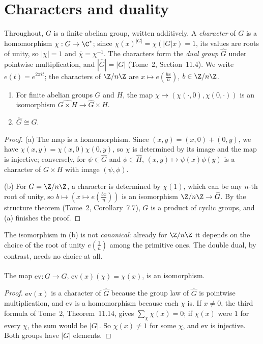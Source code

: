 \section{Characters and duality}

Throughout, $G$ is a finite abelian group, written additively. A \emph{character} of $G$ is a homomorphism $\chi:G\to\C^*$; since
$\chi(x)^{|G|}=\chi(|G|x)=1$, its values are roots of unity, so $|\chi|=1$ and $\overline{\chi}=\chi^{-1}$. The characters form the
\emph{dual group} $\widehat G$ under pointwise multiplication, and $|\widehat G|=|G|$ (Tome~2, Section~11.4). We write $e(t)=e^{2\pi it}$; the
characters of $\Z/n\Z$ are $x\mapsto e(\frac{bx}n)$, $b\in\Z/n\Z$.

\begin{proposition}\label{prop:dualprod}
\begin{enumerate}
\item[(a)] For finite abelian groups $G$ and $H$, the map $\chi\mapsto(\chi(\cdot,0),\chi(0,\cdot))$ is an isomorphism $\widehat{G\times H}\to\widehat G\times\widehat H$.
\item[(b)] $\widehat G\cong G$.
\end{enumerate}
\end{proposition}
\begin{proof}
(a) The map is a homomorphism. Since $(x,y)=(x,0)+(0,y)$, we have $\chi(x,y)=\chi(x,0)\chi(0,y)$, so $\chi$ is determined by its image
and the map is injective; conversely, for $\psi\in\widehat G$ and $\phi\in\widehat H$, $(x,y)\mapsto\psi(x)\phi(y)$ is a character of
$G\times H$ with image $(\psi,\phi)$.

(b) For $G=\Z/n\Z$, a character is determined by $\chi(1)$, which can be any $n$-th root of unity, so $b\mapsto(x\mapsto e(\frac{bx}n))$
is an isomorphism $\Z/n\Z\to\widehat G$. By the structure theorem (Tome~2, Corollary~7.7), $G$ is a product of cyclic groups, and (a)
finishes the proof.
\end{proof}

The isomorphism in (b) is not \emph{canonical}: already for $\Z/n\Z$ it depends on the choice of the root of unity $e(\frac1n)$ among the
primitive ones. The double dual, by contrast, needs no choice at all.

\begin{theorem}[duality]\label{thm:finiteduality}
The map $\mathrm{ev}:G\to\widehat{\widehat G}$, $\mathrm{ev}(x)(\chi)=\chi(x)$, is an isomorphism.
\end{theorem}
\begin{proof}
$\mathrm{ev}(x)$ is a character of $\widehat G$ because the group law of $\widehat G$ is pointwise multiplication, and $\mathrm{ev}$ is a
homomorphism because each $\chi$ is. If $x\ne0$, the third formula of Tome~2, Theorem~11.14, gives $\sum_{\chi}\chi(x)=0$; if
$\chi(x)$ were $1$ for every $\chi$, the sum would be $|G|$. So $\chi(x)\ne1$ for some $\chi$, and $\mathrm{ev}$ is injective. Both groups have $|G|$ elements.
\end{proof}

